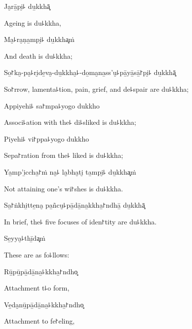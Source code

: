 Ja̮rā̱pi̮꜕ du̱kkhā͓

\begin{english}
  Ageing is du꜕kkha,
\end{english}

Ma̮꜕ra̮ṇa̱mpi̮꜕ du̱kkha͓ṁ

\begin{english}
  And death is du꜕kkha;
\end{english}

So̱꜓ka̮-pa̮꜕ri̮de̱va̮-du̱kkha̮꜕-do̱ma̮na̱ss'u̮꜕pā̱yā̱sā̱꜓pi̮꜕ du̱kkhā͓

\begin{english}
  So꜓rrow, lamenta꜕tion, pain, grief, and de꜕spair are du꜕kkha;
\end{english}

Appiyehi꜕ sa꜓mpa꜕yogo dukkho

\begin{english}
  Associ꜕ation with the꜕ di꜕sliked is du꜕kkha;
\end{english}

Piyehi꜕ vi꜓ppa꜕yogo dukkho

\begin{english}
  Sepa꜓ration from the꜕ liked is du꜕kkha;
\end{english}

Ya̱mp'i̱ccha̱꜓ṁ na̮꜕ la̮bha̮ti̮ ta̱mpi̮꜕ du̱kkha͓ṁ

\begin{english}
  Not attaining one's wi꜓shes is du꜕kkha.
\end{english}

Sa̱꜓ṅkhi̱tte̱na̮ pa̱ñcu̮꜕pā̱dā̱na̱kkha̱꜓ndhā̱ du̱kkhā͓

\begin{english}
  In brief, the꜕ five focuses of iden꜓tity are du꜕kkha.
\end{english}

Se̱yya̮꜕thī̱da͓ṁ

\begin{english}
  These are as fo꜕llows:
\end{english}

Rū̱pū̱pā̱dā̱na̱꜕kkha̱꜓ndho͓

\begin{english}
  Attachment t꜕o form,
\end{english}

Ve̱da̮nū̱pā̱dā̱na̱꜕kkha̱꜓ndho͓

\begin{english}
  Attachment to fe꜓eling,
\end{english}

